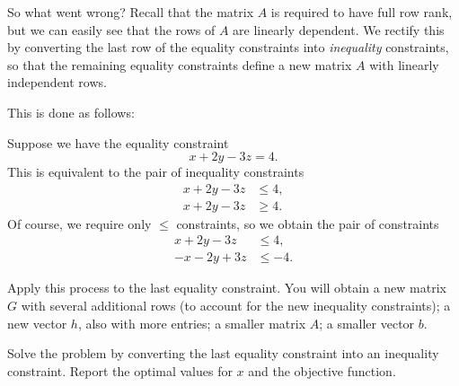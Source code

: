 So what went wrong? Recall that the matrix $A$ is required to have full row rank, but we can easily see that the rows of $A$
are linearly dependent. We rectify this by converting the last row of the equality constraints into \emph{inequality} constraints, so that
the remaining equality constraints define a new matrix $A$ with linearly independent rows.

This is done as follows:

 Suppose we have the equality constraint
\[
x + 2y - 3z = 4.
\]
This is equivalent to the pair of inequality
constraints
\begin{align*}
x + 2y - 3z &\leq 4, \\
x + 2y - 3z &\geq 4.
\end{align*}
Of course, we require only $\leq$ constraints, so we obtain the pair
of constraints
\begin{align*}
x + 2y - 3z &\leq 4, \\
-x - 2y + 3z &\leq -4.
\end{align*}

Apply this process to the last equality constraint. 
You will obtain a new matrix $G$ with several additional rows (to account for the new inequality
constraints); a new vector $h$, also with more entries; a smaller matrix $A$; a smaller vector $b$. 
\begin{problem}
Solve the problem by converting the last equality constraint into an inequality constraint.
Report the optimal values for $x$ and the objective function.
\end{problem}

